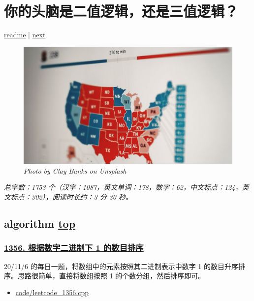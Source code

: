 \chapter{你的头脑是二值逻辑，还是三值逻辑？}\label{chap:w1}

\noindent \href{https://github.com/taseikyo/arts}{readme} | \hyperref[chap:w2]{next}

\begin{figure}[htbp]
  \centering
    \includegraphics[width=\textwidth]{../images/2020/11/clay-banks-BY-R0UNRE7w-unsplash.jpg}
  \caption{\textit{Photo by Clay Banks on Unsplash}}
\end{figure}

\textit{总字数：1753 个（汉字：1087，英文单词：178，数字：62，中文标点：124，英文标点：302），阅读时长约：3 分 30 秒。}

\section{algorithm \hyperref[chap:w1]{top}}\label{w1:algorithm}

\subsection{\href{https://leetcode-cn.com/problems/sort-integers-by-the-number-of-1-bits}{1356. 根据数字二进制下 1 的数目排序}}

20/11/6 的每日一题，将数组中的元素按照其二进制表示中数字 1 的数目升序排序。思路很简单，直接将数组按照 1 的个数分组，然后排序即可。

\begin{itemize}
  \item \href{https://github.com/taseikyo/arts/blob/master/code/leetcode_1356.cpp}{code/leetcode\_1356.cpp}
\end{itemize}

